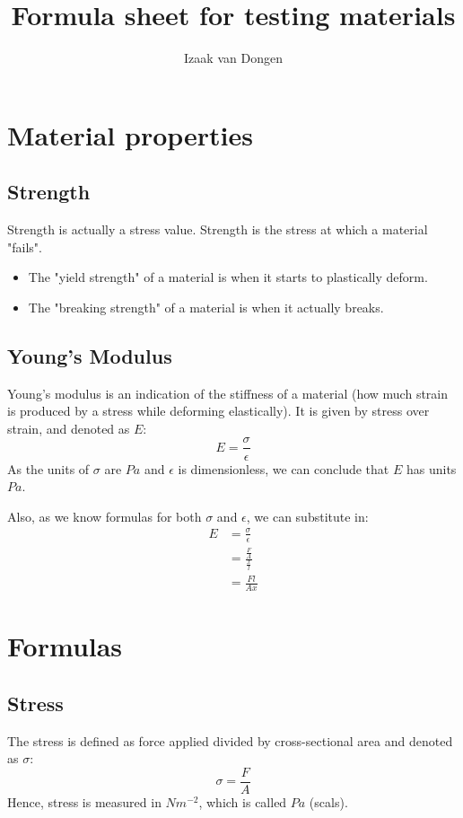 \documentclass{article}
\title{Formula sheet for testing materials}
\author{Izaak van Dongen}
\begin{document}
    \maketitle
    \tableofcontents
    \section{Material properties}
        \subsection{Strength}
            Strength is actually a stress value. Strength is the stress at
            which a material "fails".
            \begin{itemize}
                \item
                    The "yield strength" of a material is when it starts to
                    plastically deform.
                \item
                    The "breaking strength" of a material is when it actually
                    breaks.
            \end{itemize}
        \subsection{Young's Modulus}
            Young's modulus is an indication of the stiffness of a material
            (how much strain is produced by a stress while deforming
            elastically). It is given by stress over strain, and denoted as
            $E$:
            \begin{equation}
                E = \frac{\sigma}{\epsilon}
            \end{equation}
            As the units of $\sigma$ are $Pa$ and $\epsilon$ is dimensionless,
            we can conclude that $E$ has units $Pa$.

            Also, as we know formulas for both $\sigma$ and $\epsilon$, we can
            substitute in:
            \begin{align*}
                E &= \frac{\sigma}{\epsilon}\\
                  &= \frac{\frac{F}{A}}{\frac{x}{l}}\\
                  &= \frac{Fl}{Ax}
            \end{align*}
    \section{Formulas}
        \subsection{Stress}
            The stress is defined as force applied divided by cross-sectional
            area and denoted as $\sigma$:
            \begin{equation}
                \sigma = \frac{F}{A}
            \end{equation}
            Hence, stress is measured in $Nm^{-2}$, which is called $Pa$ (scals).
\end{document}
